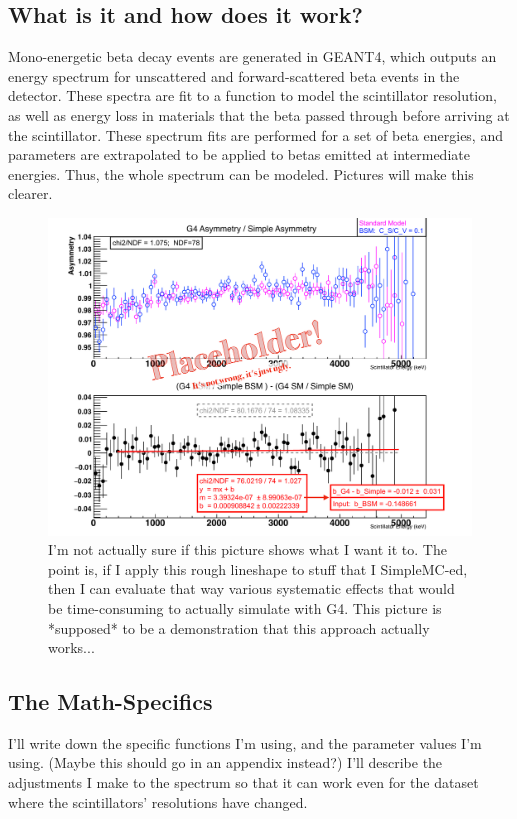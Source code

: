 	\subsection{What is it and how does it work?}
	Mono-energetic beta decay events are generated in GEANT4, which outputs an energy spectrum for unscattered and forward-scattered beta events in the detector.  These spectra are fit to a function to model the scintillator resolution, as well as energy loss in materials that the beta passed through before arriving at the scintillator.  These spectrum fits are performed for a set of beta energies, and parameters are extrapolated to be applied to betas emitted at intermediate energies.  Thus, the whole spectrum can be modeled.  Pictures will make this clearer. 
	
    \begin{figure}[h!!!t]
    	\centering
    	\includegraphics[width=.999\linewidth]
    	{Figures/LineshapeDemo_prelim.pdf}
    	\caption[Lineshape Comparison]{I'm not actually sure if this picture shows what I want it to.  The point is, if I apply this rough lineshape to stuff that I SimpleMC-ed, then I can evaluate that way various systematic effects that would be time-consuming to actually simulate with G4.  This picture is  *supposed* to be a demonstration that this approach actually works...}	
    	\label{fig:lineshape_demo}
    \end{figure}
	
	\subsection{The Math-Specifics}
	I'll write down the specific functions I'm using, and the parameter values I'm using.  (Maybe this should go in an appendix instead?)  I'll describe the adjustments I make to the spectrum so that it can work even for the dataset where the scintillators' resolutions have changed.
	
